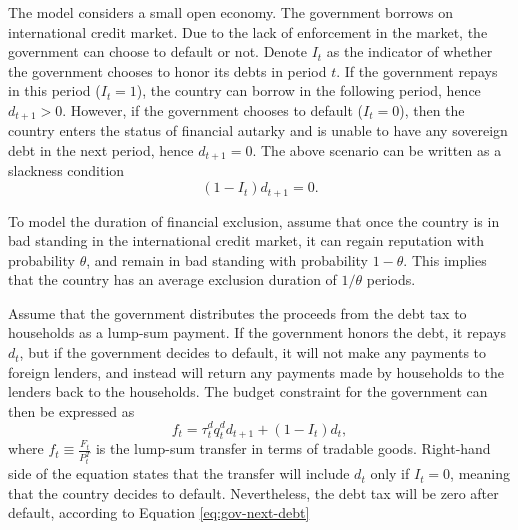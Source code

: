The model considers a small open economy. The government borrows on international credit market.
Due to the lack of enforcement in the market, the government can choose to default or not. Denote $I_t$ as the indicator of whether the government chooses to honor its debts in period $t$. If the government repays in this period ($I_{t} = 1$), the country can borrow in the following period, hence $d_{t+1} > 0$. However, if the government chooses to default ($I_t = 0$), then the country enters the status of financial autarky and is unable to have any sovereign debt in the next period, hence $d_{t+1} = 0$. The above scenario can be written as a slackness condition
\begin{equation}
    \label{eq:gov-next-debt}
    (1 - I_t)d_{t+1} = 0 .
\end{equation}

To model the duration of financial exclusion, assume that once the country is in bad standing in the international credit market, it can regain reputation with probability $\theta$, and remain in bad standing with probability $1-\theta$. This implies that the country has an average exclusion duration of $1/\theta$ periods.

Assume that the government distributes the proceeds from the debt tax to households as a lump-sum payment. If the government honors the debt, it repays $d_t$, but if the government decides to default, it will not make any payments to foreign lenders, and instead will return any payments made by households to the lenders back to the households. The budget constraint for the government can then be expressed as
\begin{equation}
    \label{eq:gov-budget}
    f_t = \tau_t^d q_t^d d_{t+1} + (1-I_t)d_t,
\end{equation}
where $f_t \equiv \frac{F_t}{P^T_t}$ is the lump-sum transfer in terms of tradable goods. Right-hand side of the equation states that the transfer will include $d_t$ only if $I_t = 0$, meaning that the country decides to default. Nevertheless, the debt tax will be zero after default, according to Equation \eqref{eq:gov-next-debt}